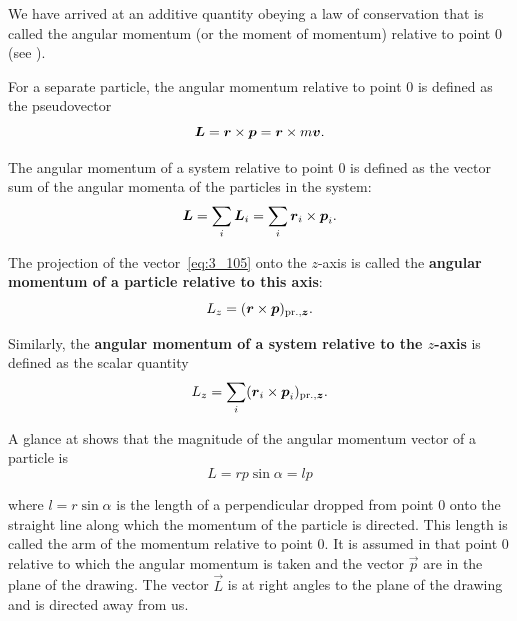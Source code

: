 \noindent
We have arrived at an additive quantity obeying a law of conservation that is called the angular momentum (or the moment of momentum) relative to point $0$ (see ).

For a separate particle, the angular momentum relative to point $0$ is defined as the pseudovector
\begin{equation}\label{eq:3_105}
\boldsymbol{L} = \boldsymbol{r}\times\boldsymbol{p} = \boldsymbol{r}\times m\boldsymbol{v}.
\end{equation}

\noindent
The angular momentum of a system relative to point $0$ is defined as the vector sum of the angular momenta of the particles in the system:
\begin{equation}\label{eq:3_106}
\boldsymbol{L} = \sum_{i}\boldsymbol{L}_i = \sum_{i} \boldsymbol{r}_{i}\times\boldsymbol{p}_{i}.
\end{equation}

The projection of the vector~\eqref{eq:3_105} onto the $z$-axis is called the \textbf{angular momentum of a particle relative to this axis}:
\begin{equation}\label{eq:3_107}
L_z = (\boldsymbol{r}\times\boldsymbol{p})_{\text{pr.},\boldsymbol{z}}.
\end{equation}

\noindent
Similarly, the \textbf{angular momentum of a system relative to the $z$-axis} is defined as the scalar quantity
\begin{equation}\label{eq:3_108}
L_z = \sum_i (\boldsymbol{r}_{i}\times\boldsymbol{p}_{i})_{\text{pr.},\boldsymbol{z}}.
\end{equation}


\noindent
A glance at  shows that the magnitude of the angular momentum vector of a particle is
\begin{equation}\label{eq:3_109}
L = rp\sin\alpha = lp
\end{equation}

\noindent
where $l=r\sin\alpha$ is the length of a perpendicular dropped from point $0$ onto the straight line along which the momentum of the particle is directed. This length is called the arm of the momentum relative to point $0$. It is assumed in  that point $0$ relative to which the angular momentum is taken and the vector $\vec{p}$ are in the plane of the drawing. The vector $\vec{L}$ is at right angles to the plane of the drawing and is directed away from us.

